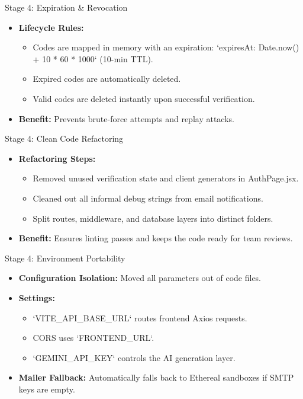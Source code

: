 \documentclass[aspectratio=169]{beamer}
\begin{document}
\begin{frame}{Stage 4: Expiration \& Revocation}
  \begin{itemize}
    \item \textbf{Lifecycle Rules:}
      \begin{itemize}
        \item Codes are mapped in memory with an expiration: `expiresAt: Date.now() + 10 * 60 * 1000` (10-min TTL).
        \item Expired codes are automatically deleted.
        \item Valid codes are deleted instantly upon successful verification.
      \end{itemize}
    \item \textbf{Benefit:} Prevents brute-force attempts and replay attacks.
  \end{itemize}
\end{frame}

\begin{frame}{Stage 4: Clean Code Refactoring}
  \begin{itemize}
    \item \textbf{Refactoring Steps:}
      \begin{itemize}
        \item Removed unused verification state and client generators in AuthPage.jsx.
        \item Cleaned out all informal debug strings from email notifications.
        \item Split routes, middleware, and database layers into distinct folders.
      \end{itemize}
    \item \textbf{Benefit:} Ensures linting passes and keeps the code ready for team reviews.
  \end{itemize}
\end{frame}

\begin{frame}{Stage 4: Environment Portability}
  \begin{itemize}
    \item \textbf{Configuration Isolation:} Moved all parameters out of code files.
    \item \textbf{Settings:}
      \begin{itemize}
        \item `VITE_API_BASE_URL` routes frontend Axios requests.
        \item CORS uses `FRONTEND_URL`.
        \item `GEMINI_API_KEY` controls the AI generation layer.
      \end{itemize}
    \item \textbf{Mailer Fallback:} Automatically falls back to Ethereal sandboxes if SMTP keys are empty.
  \end{itemize}
\end{frame}
\end{document}
